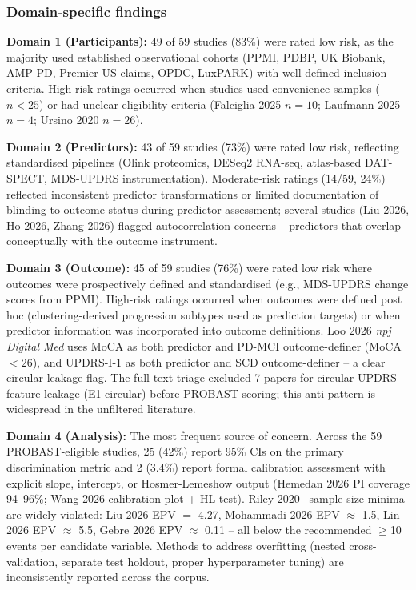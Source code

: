 \subsubsection{Domain-specific findings}
\textbf{Domain 1 (Participants):} 49 of 59 studies (83\%) were rated low risk, as the majority used established observational cohorts (PPMI, PDBP, UK Biobank, AMP-PD, Premier US claims, OPDC, LuxPARK) with well-defined inclusion criteria. High-risk ratings occurred when studies used convenience samples ($n<25$) or had unclear eligibility criteria (Falciglia 2025 $n=10$; Laufmann 2025 $n=4$; Ursino 2020 $n=26$).

\textbf{Domain 2 (Predictors):} 43 of 59 studies (73\%) were rated low risk, reflecting standardised pipelines (Olink proteomics, DESeq2 RNA-seq, atlas-based DAT-SPECT, MDS-UPDRS instrumentation). Moderate-risk ratings (14/59, 24\%) reflected inconsistent predictor transformations or limited documentation of blinding to outcome status during predictor assessment; several studies (Liu 2026, Ho 2026, Zhang 2026) flagged autocorrelation concerns -- predictors that overlap conceptually with the outcome instrument.

\textbf{Domain 3 (Outcome):} 45 of 59 studies (76\%) were rated low risk where outcomes were prospectively defined and standardised (e.g., MDS-UPDRS change scores from PPMI). High-risk ratings occurred when outcomes were defined post hoc (clustering-derived progression subtypes used as prediction targets) or when predictor information was incorporated into outcome definitions. Loo 2026 \textit{npj Digital Med} uses MoCA as both predictor and PD-MCI outcome-definer (MoCA${<}26$), and UPDRS-I-1 as both predictor and SCD outcome-definer -- a clear circular-leakage flag. The full-text triage excluded 7 papers for circular UPDRS-feature leakage (E1-circular) before PROBAST scoring; this anti-pattern is widespread in the unfiltered literature.

\textbf{Domain 4 (Analysis):} The most frequent source of concern. Across the 59 PROBAST-eligible studies, 25 (42\%) report 95\% CIs on the primary discrimination metric and 2 (3.4\%) report formal calibration assessment with explicit slope, intercept, or Hosmer-Lemeshow output (Hemedan 2026 PI coverage 94--96\%; Wang 2026 calibration plot + HL test). Riley 2020~\cite{riley2020} sample-size minima are widely violated: Liu 2026 EPV $=$ 4.27, Mohammadi 2026 EPV $\approx$ 1.5, Lin 2026 EPV $\approx$ 5.5, Gebre 2026 EPV $\approx$ 0.11 -- all below the recommended $\geq$10 events per candidate variable. Methods to address overfitting (nested cross-validation, separate test holdout, proper hyperparameter tuning) are inconsistently reported across the corpus.

